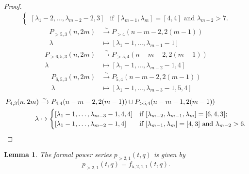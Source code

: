 \documentclass[a4paper, 12pt, reqno]{amsart}
\newtheorem{lemma}[theorem]{Lemma}
\theoremstyle{remark}
\numberwithin{equation}{subsection}
\begin{document}
\begin{proof}
\begin{align*}
\begin{cases}
                [\lambda_1 - 2, \dots, \lambda_{m - 2} - 2, 3] &\text{if }[\lambda_{m - 1}, \lambda_m] = [4, 4]\text{ and }\lambda_{m - 2} > 7.
              \end{cases}
  \end{align*}
  \begin{align*}
    P_{>5, 3}(n, 2m) &\xrightarrow{\sim} P_{>4}(n - m - 2, 2(m - 1)) \\
    \lambda &\mapsto [\lambda_1 - 1, \dots, \lambda_{m - 1} - 1]
  \end{align*}
  \begin{align*}
    P_{>6, 5, 3}(n, 2m) &\xrightarrow{\sim} P_{>5, 4}(n - m - 2, 2(m - 1)) \\
    \lambda &\mapsto [\lambda_1 - 1, \dots, \lambda_{m - 2} - 1, 4]
  \end{align*}
  \begin{align*}
    P_{6, 5, 3}(n, 2m) &\xrightarrow{\sim} P_{5, 4}(n - m - 2, 2(m - 1)) \\
    \lambda &\mapsto [\lambda_1 - 1, \dots, \lambda_{m - 3} - 1, 5, 4]
  \end{align*}
  \begin{align*}
    P_{4, 3}(n, 2m) &\xrightarrow{\sim} P_{4, 4}(n - m - 2, 2(m - 1)) \cup P_{>5, 4}(n - m - 1, 2(m - 1)) \\
    \lambda &\mapsto
              \begin{cases}
                [\lambda_1 - 1, \dots, \lambda_{m - 3} - 1, 4, 4] &\text{if }[\lambda_{m - 2}, \lambda_{m - 1}, \lambda_m] = [6, 4, 3]; \\
                [\lambda_1 - 1, \dots, \lambda_{m - 2} - 1, 4] &\text{if }[\lambda_{m - 1}, \lambda_m] = [4, 3]\text{ and }\lambda_{m - 2} > 6. \qedhere
              \end{cases}
  \end{align*}
\end{proof}

\begin{lemma}
  \label{lmm:23}
  The formal power series $p_{>2, 1}(t, q)$ is given by
  \begin{equation*}
    p_{>2, 1}(t, q)=f_{5, 2, 1, 1}(t, q).
  \end{equation*}
\end{lemma}
\end{document}
